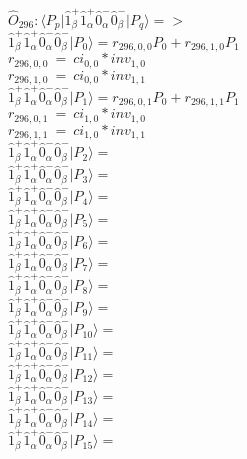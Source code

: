 \documentclass[14pt]{article}
\begin{document}
    $\hat{O}_{296}:  \langle{P_p}\vert \hat{1}_{\beta}^{+}\hat{1}_{\alpha}^{+}\hat{0}_{\alpha}^{-}\hat{0}_{\beta}^{-} \vert{P_q}\rangle => $ \\ 
    $ \hat{1}_{\beta}^{+}\hat{1}_{\alpha}^{+}\hat{0}_{\alpha}^{-}\hat{0}_{\beta}^{-} \vert{P_{0}}\rangle = {r}_{296,0,0}P_{0}+{r}_{296,1,0}P_{1} $ \\ 
    ${r}_{296,0,0}\ =\ {ci}_{0,0}*{inv}_{1,0} $ \\ 
    ${r}_{296,1,0}\ =\ {ci}_{0,0}*{inv}_{1,1} $ \\ 
    $ \hat{1}_{\beta}^{+}\hat{1}_{\alpha}^{+}\hat{0}_{\alpha}^{-}\hat{0}_{\beta}^{-} \vert{P_{1}}\rangle = {r}_{296,0,1}P_{0}+{r}_{296,1,1}P_{1} $ \\ 
    ${r}_{296,0,1}\ =\ {ci}_{1,0}*{inv}_{1,0} $ \\ 
    ${r}_{296,1,1}\ =\ {ci}_{1,0}*{inv}_{1,1} $ \\ 
    $ \hat{1}_{\beta}^{+}\hat{1}_{\alpha}^{+}\hat{0}_{\alpha}^{-}\hat{0}_{\beta}^{-} \vert{P_{2}}\rangle =  $ \\ 
    $ \hat{1}_{\beta}^{+}\hat{1}_{\alpha}^{+}\hat{0}_{\alpha}^{-}\hat{0}_{\beta}^{-} \vert{P_{3}}\rangle =  $ \\ 
    $ \hat{1}_{\beta}^{+}\hat{1}_{\alpha}^{+}\hat{0}_{\alpha}^{-}\hat{0}_{\beta}^{-} \vert{P_{4}}\rangle =  $ \\ 
    $ \hat{1}_{\beta}^{+}\hat{1}_{\alpha}^{+}\hat{0}_{\alpha}^{-}\hat{0}_{\beta}^{-} \vert{P_{5}}\rangle =  $ \\ 
    $ \hat{1}_{\beta}^{+}\hat{1}_{\alpha}^{+}\hat{0}_{\alpha}^{-}\hat{0}_{\beta}^{-} \vert{P_{6}}\rangle =  $ \\ 
    $ \hat{1}_{\beta}^{+}\hat{1}_{\alpha}^{+}\hat{0}_{\alpha}^{-}\hat{0}_{\beta}^{-} \vert{P_{7}}\rangle =  $ \\ 
    $ \hat{1}_{\beta}^{+}\hat{1}_{\alpha}^{+}\hat{0}_{\alpha}^{-}\hat{0}_{\beta}^{-} \vert{P_{8}}\rangle =  $ \\ 
    $ \hat{1}_{\beta}^{+}\hat{1}_{\alpha}^{+}\hat{0}_{\alpha}^{-}\hat{0}_{\beta}^{-} \vert{P_{9}}\rangle =  $ \\ 
    $ \hat{1}_{\beta}^{+}\hat{1}_{\alpha}^{+}\hat{0}_{\alpha}^{-}\hat{0}_{\beta}^{-} \vert{P_{10}}\rangle =  $ \\ 
    $ \hat{1}_{\beta}^{+}\hat{1}_{\alpha}^{+}\hat{0}_{\alpha}^{-}\hat{0}_{\beta}^{-} \vert{P_{11}}\rangle =  $ \\ 
    $ \hat{1}_{\beta}^{+}\hat{1}_{\alpha}^{+}\hat{0}_{\alpha}^{-}\hat{0}_{\beta}^{-} \vert{P_{12}}\rangle =  $ \\ 
    $ \hat{1}_{\beta}^{+}\hat{1}_{\alpha}^{+}\hat{0}_{\alpha}^{-}\hat{0}_{\beta}^{-} \vert{P_{13}}\rangle =  $ \\ 
    $ \hat{1}_{\beta}^{+}\hat{1}_{\alpha}^{+}\hat{0}_{\alpha}^{-}\hat{0}_{\beta}^{-} \vert{P_{14}}\rangle =  $ \\ 
    $ \hat{1}_{\beta}^{+}\hat{1}_{\alpha}^{+}\hat{0}_{\alpha}^{-}\hat{0}_{\beta}^{-} \vert{P_{15}}\rangle =  $ \\ 
    
\end{document}
